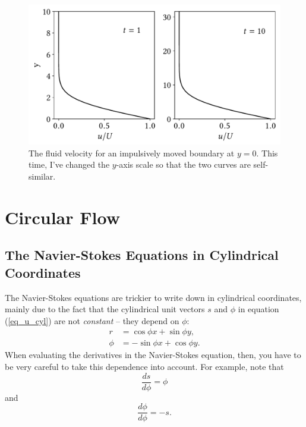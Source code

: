 \begin{figure}
\centering
\includegraphics[width=0.8\linewidth]{Figures/Chapter2/fig_ss_vel2}
\caption{The fluid velocity for an impulsively moved boundary at $y=0$.  This time, I've changed the $y$-axis scale so that the two curves are self-similar. }
\label{fig_ss_vel2}
\end{figure}


%
% 

\section{Circular Flow}



\subsection{The Navier-Stokes Equations in Cylindrical Coordinates}
\label{sec_ns_cyl}

The Navier-Stokes equations are trickier to write down in cylindrical coordinates, mainly due to the fact that the cylindrical unit vectors $\unit{s}$ and $\unit{\phi}$ in equation (\ref{eq_u_cyl}) are not \emph{constant} -- they depend on $\phi$:
\begin{align*}
\unit{r} & = \cos \phi \unit{x} + \sin \phi \unit{y}, \\
\unit{\phi} & = - \sin \phi \unit{x} + \cos \phi \unit{y}.
\end{align*}
When evaluating the derivatives in the Navier-Stokes equation, then, you have to be very careful to take this dependence into account.  For example, note that
\[
\frac{d\unit{s}}{d\phi} = \unit{\phi}
\]
and
\[
\frac{d\unit{\phi}}{d\phi} = - \unit{s}.
\]

